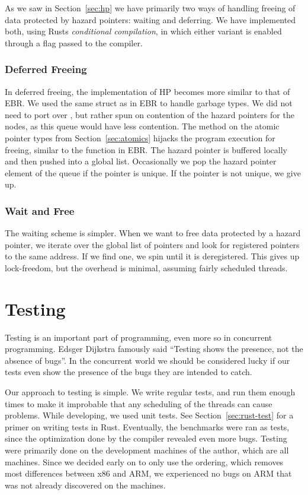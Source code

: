 \documentclass[b5paper]{report}
\begin{document}
As we saw in Section~\ref{sec:hp} we have primarily two ways
of handling freeing of data protected by hazard pointers: waiting and deferring.
We have implemented both, using Rusts \emph{conditional compilation}, in which
either variant is enabled through a flag passed to the compiler.

\subsubsection{Deferred Freeing} In deferred freeing, the implementation of HP
becomes more similar to that of EBR\@. We used the same  struct as
in EBR to handle garbage types. We did not need to port over , but
rather spun on contention of the hazard pointers for the nodes, as this queue
would have less contention.  The  method on the atomic pointer
types from Section~\ref{sec:atomics} hijacks the program execution for freeing,
similar to the  function in EBR\@. The hazard pointer is buffered
locally and then pushed into a global list. Occasionally we pop the hazard
pointer element of the queue if the pointer is unique. If the pointer is not
unique, we give up.

\subsubsection{Wait and Free}
The waiting scheme is simpler. When we want to free data protected by a hazard
pointer, we iterate over the global list of pointers and look for registered
pointers to the same address. If we find one, we spin until it is deregistered.
This gives up lock-freedom, but the overhead is minimal, assuming fairly
scheduled threads.


\section{Testing}
Testing is an important part of programming, even more so in concurrent
programming. Edsger Dijkstra famously said ``Testing shows the presence, not the
absence of bugs''\cite{buxton1970software}. In the concurrent world we should be
considered lucky if our tests even show the presence of the bugs they are
intended to catch.

Our approach to testing is simple. We write regular tests, and run them enough
times to make it improbable that any scheduling of the threads can cause
problems. While developing, we used unit tests. See Section~\ref{sec:rust-test}
for a primer on writing tests in Rust. Eventually, the benchmarks were ran as
tests, since the optimization done by the compiler revealed even more bugs.
Testing were primarily done on the development machines of the author, which are
all  machines. Since we decided early on to only use the 
ordering, which removes most differences between x86 and ARM, we experienced no
bugs on ARM that was not already discovered on the  machines.
\end{document}
